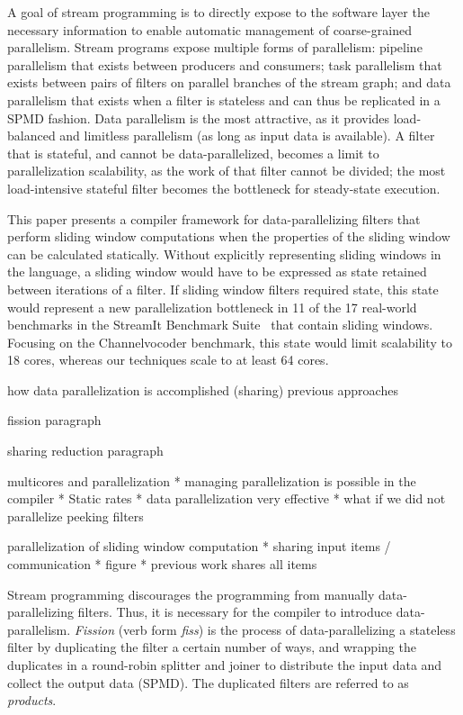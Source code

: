 A goal of stream programming is to directly expose to the software
layer the necessary information to enable automatic management of
coarse-grained parallelism.  Stream programs expose multiple forms of
parallelism: pipeline parallelism that exists between producers and
consumers; task parallelism that exists between pairs of filters on
parallel branches of the stream graph; and data parallelism that
exists when a filter is stateless and can thus be replicated in a SPMD
fashion.  Data parallelism is the most attractive, as it provides
load-balanced and limitless parallelism (as long as input data is
available).  A filter that is stateful, and cannot be
data-parallelized, becomes a limit to parallelization scalability, as
the work of that filter cannot be divided; the most load-intensive
stateful filter becomes the bottleneck for steady-state execution.

This paper presents a compiler framework for data-parallelizing
filters that perform sliding window computations when the properties
of the sliding window can be calculated statically.   Without explicitly
representing sliding windows in the language, a sliding window would
have to be expressed as state retained between iterations of a
filter.  If sliding window filters required state, this state would
represent a new parallelization bottleneck in 11 of the
17 real-world benchmarks in the StreamIt Benchmark
Suite~\cite{streamit-suite} that contain sliding windows.  Focusing
on the Channelvocoder benchmark, this state would limit scalability to
18 cores, whereas our techniques scale to at least 64 cores.

how data parallelization is accomplished (sharing)
previous approaches

fission paragraph

sharing reduction paragraph


multicores and parallelization
* managing parallelization is possible in the compiler
* Static rates
* data parallelization very effective
* what if we did not parallelize peeking filters

parallelization of sliding window computation
* sharing input items / communication
* figure
* previous work shares all items 

Stream programming discourages the programming from manually
data-parallel\-izing filters. Thus, it is necessary for
the compiler to introduce data-parallelism.  {\it Fission} (verb form
{\it fiss}) is the process of data-parallelizing a stateless filter by
duplicating the filter a certain number of ways, and wrapping the
duplicates in a round-robin splitter and joiner to distribute the
input data and collect the output data (SPMD).  The duplicated filters
are referred to as {\it products}. 

